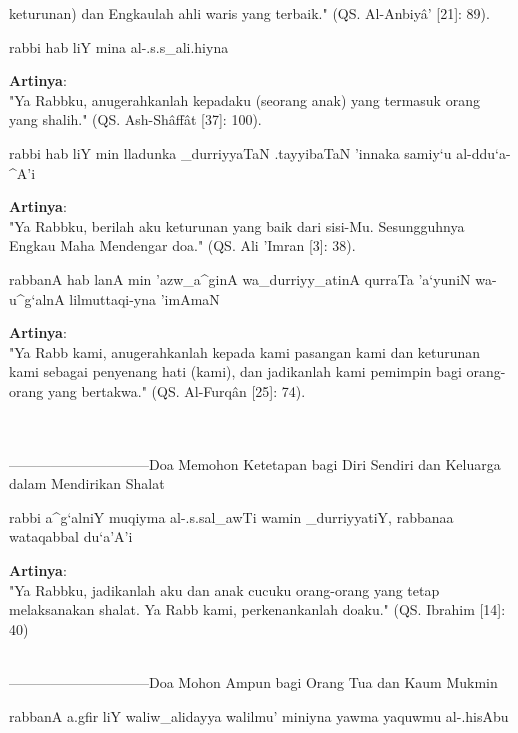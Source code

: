 \documentclass[a4paper,12pt]{article}
\begin{document}
keturunan) dan Engkaulah ahli waris yang terbaik." (QS. Al-Anbiy\^{a}' 
[21]: 89).\\
\begin{arabtext}
\noindent
rabbi hab liY mina al-.s.s_ali.hiyna
\end{arabtext}
\noindent
\textbf{Artinya}:\\
\indent
"Ya Rabbku, anugerahkanlah kepadaku (seorang anak) yang termasuk orang yang
shalih." (QS. Ash-Sh\^{a}ff\^{a}t [37]: 100).\\
\begin{arabtext}
\noindent
rabbi hab liY min lladunka _durriyyaTaN .tayyibaTaN 'innaka samiy`u 
al-ddu`a-^A'i
\end{arabtext}
\noindent
\textbf{Artinya}:\\
\indent
"Ya Rabbku, berilah aku keturunan yang baik dari sisi-Mu. Sesungguhnya 
Engkau Maha Mendengar doa." (QS. Ali 'Imran [3]: 38).\\
\begin{arabtext}
\noindent
rabbanA hab lanA min 'azw_a^ginA wa_durriyy_atinA qurraTa 'a`yuniN 
wa-u^g`alnA lilmuttaqi-yna 'imAmaN
\end{arabtext}
\noindent
\textbf{Artinya}:\\
\indent
"Ya Rabb kami, anugerahkanlah kepada kami pasangan kami dan keturunan kami 
sebagai penyenang hati (kami), dan jadikanlah kami pemimpin bagi 
orang-orang yang bertakwa." (QS. Al-Furq\^{a}n [25]: 74).\\\\\\
\par
{}------------------------------Doa Memohon Ketetapan bagi Diri Sendiri dan Keluarga dalam Mendirikan Shalat
\begin{arabtext}
\noindent
rabbi a^g`alniY muqiyma al-.s.sal_awTi wamin _durriyyatiY, rabbanaa 
wataqabbal du`a'A'i
\end{arabtext}
\noindent
\textbf{Artinya}:\\
\indent
"Ya Rabbku, jadikanlah aku dan anak cucuku orang-orang yang tetap 
melaksanakan shalat. Ya Rabb kami, perkenankanlah doaku." (QS. Ibrahim
[14]: 40)\\\\
\par
{}------------------------------Doa Mohon Ampun bagi Orang Tua dan Kaum Mukmin
\begin{arabtext}
\noindent
rabbanA a.gfir liY waliw_alidayya walilmu' miniyna yawma yaquwmu al-.hisAbu
\end{arabtext}
\end{document}
